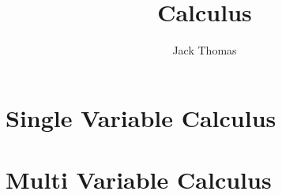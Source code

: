\documentclass[]{report}
\begin{document}
\title{Calculus}
\author{Jack Thomas}
\date{}

\maketitle
\newpage

\tableofcontents
\newpage

\part{Single Variable Calculus}






\part{Multi Variable Calculus}




\end{document}
